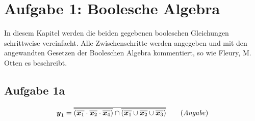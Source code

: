 

\section{Aufgabe 1: Boolesche Algebra}
In diesem Kapitel werden die beiden gegebenen booleschen Gleichungen schrittweise vereinfacht. 
Alle Zwischenschritte werden angegeben und mit den angewandten Gesetzen der Booleschen Algebra kommentiert, so wie Fleury, M. Otten \cite{2} es beschreibt.
\subsection{Aufgabe 1a}
\begin{equation}
    \boldsymbol{y}_1 = \overline{ \overline{(\overline{\boldsymbol{x}_1} \cdot \overline{\boldsymbol{x}_2} \cdot \overline{\boldsymbol{x}_4})} 
    \cap \overline{(\overline{\boldsymbol{x}_1} \cup \overline{\boldsymbol{x}_2} \cup \overline{\boldsymbol{x}_3})} } \tag{\textit{Angabe}}
\end{equation}
